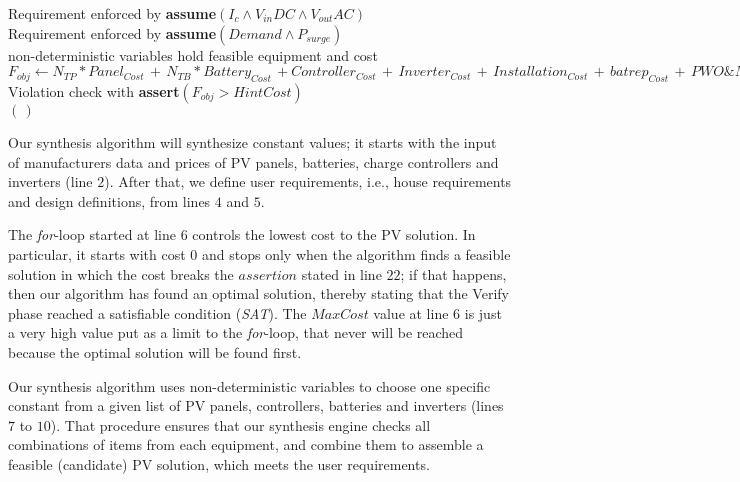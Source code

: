 \begin{algorithm}
\begin{algorithmic}[1]
 	\STATE Requirement enforced by \textbf{assume}$(I_{c} \wedge V_{in}DC \wedge V_{out}AC)$ \\
	\STATE Requirement enforced by \textbf{assume}$(Demand \wedge P_{surge})$ \\
	\STATE non-deterministic variables hold feasible equipment and cost  \\
	\STATE $F_{obj} \leftarrow  N_{TP}*Panel_{Cost} \, + \, N_{TB}*Battery_{Cost} \, + Controller_{Cost} \, + \, Inverter_{Cost} \, + \, Installation_{Cost} \, + \, batrep_{Cost} \, + \, PWO\&M_{Cost}$ \\
	\STATE Violation check with \textbf{assert}$(F_{obj} > HintCost)$ \\
  \ENDFOR
 \RETURN $(\,)$ 
 \end{algorithmic} 
 \label{alg:opt-algorithm}
 \end{algorithm}

Our synthesis algorithm will synthesize constant values; 
it starts with the input of manufacturers data and prices of PV panels, batteries, 
charge controllers and inverters (line $2$). After that, we define user requirements, i.e., 
house requirements and design definitions, from lines $4$ and $5$. 

The \textit{for}-loop started at line $6$ controls the lowest cost to the PV solution. 
In particular, it starts with cost $0$ and stops only when the algorithm finds a 
feasible solution in which the cost breaks the $assertion$ stated in line $22$; 
if that happens, then our algorithm has found an optimal solution, thereby stating 
that the {\sc Verify} phase reached a satisfiable condition (\textit{SAT}). 
The $MaxCost$ value at line $6$ is just a very high value put as a limit 
to the \textit{for}-loop, that never will be reached because the optimal solution will be found first.

Our synthesis algorithm uses non-deterministic variables to choose one specific constant 
from a given list of PV panels, controllers, batteries and inverters (lines $7$ to $10$). 
That procedure ensures that our synthesis engine checks all combinations of items 
from each equipment, and combine them to assemble a feasible (candidate) PV solution, 
which meets the user requirements.

